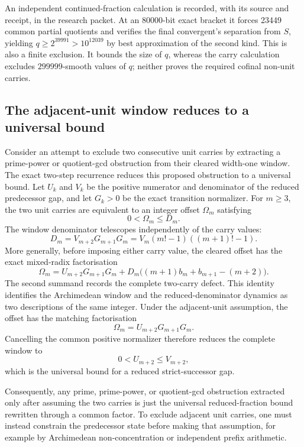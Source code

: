 \documentclass[11pt]{article}
\newcommand{\Ser}{S}
\begin{document}
An independent continued-fraction calculation is recorded, with its source
and receipt, in the research packet.  At an 80000-bit exact bracket it forces
23449 common partial quotients and verifies
the final convergent's separation from $\Ser$, yielding
$q\ge2^{39991}>10^{12039}$ by best approximation of the second kind.  This
is also a finite exclusion.  It bounds the size of $q$, whereas the carry
calculation excludes $299999$-smooth values of $q$; neither proves the required
cofinal non-unit carries.

\subsection{The adjacent-unit window reduces to a universal bound}
\label{sec:adjacent-unit-no-go}

Consider an attempt to exclude two consecutive unit carries by extracting a
prime-power or quotient-gcd obstruction from their cleared width-one window.
The exact two-step recurrence reduces this proposed obstruction to a universal
bound.  Let $U_k$ and $V_k$
be the positive numerator and denominator of the reduced predecessor gap, and
let $G_k>0$ be the exact transition normalizer.  For $m\ge3$, the two unit
carries are equivalent to an integer offset $\Omega_m$ satisfying
\[
  0<\Omega_m\le D_m.
\]
The window denominator telescopes independently of the carry values:
\[
  D_m=V_{m+2}G_{m+1}G_m
     =V_m(m!-1)((m+1)!-1).
\]
More generally, before imposing either carry value, the cleared offset has the
exact mixed-radix factorisation
\[
 \Omega_m=U_{m+2}G_{m+1}G_m
   +D_m\bigl((m+1)b_m+b_{m+1}-(m+2)\bigr).
\]
The second summand records the complete two-carry defect.  This identity
identifies the Archimedean window and
the reduced-denominator dynamics as two descriptions of the same integer.
Under the adjacent-unit assumption, the offset has the matching
factorisation
\[
  \Omega_m=U_{m+2}G_{m+1}G_m.
\]
Cancelling the common positive normalizer therefore reduces the complete
window to
\[
  0<U_{m+2}\le V_{m+2},
\]
which is the universal bound for a reduced strict-successor gap.

Consequently, any prime, prime-power, or quotient-gcd obstruction extracted
only after assuming the two carries is just the universal reduced-fraction
bound rewritten through a common factor.  To exclude adjacent unit carries,
one must instead constrain the predecessor state before making that
assumption, for example by Archimedean non-concentration or independent prefix
arithmetic.
\end{document}
